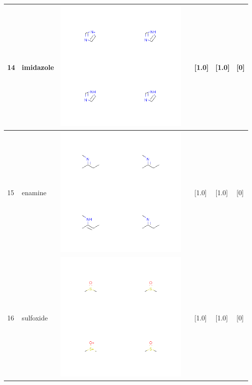 \begin{longtable}{|l|l|l|l|l|l|l|}
14 & imidazole & \includegraphics[scale=0.6]{imidazoleCA.png} & & [1.0]& [1.0] & [0] \\
\hline
15 & enamine & \includegraphics[scale=0.6]{enamineCA.png} & & [1.0]& [1.0] & [0] \\
\hline
16 & sulfoxide & \includegraphics[scale=0.6]{sulfoxideCA.png} & & [1.0]& [1.0] & [0] \\

\end{longtable}

